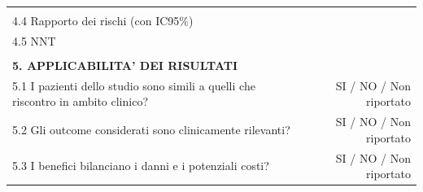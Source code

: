 \documentclass[]{book}
\begin{document}
\begin{longtable}[]{@{}lr@{}}
\begin{minipage}[t]{0.47\columnwidth}
\strut
\end{minipage}\tabularnewline
\begin{minipage}[t]{0.47\columnwidth}\raggedright
4.4 Rapporto dei rischi (con IC95\%)\strut
\end{minipage} & \begin{minipage}[t]{0.47\columnwidth}\raggedleft
\strut
\end{minipage}\tabularnewline
\begin{minipage}[t]{0.47\columnwidth}\raggedright
4.5 NNT\strut
\end{minipage} & \begin{minipage}[t]{0.47\columnwidth}\raggedleft
\strut
\end{minipage}\tabularnewline
\begin{minipage}[t]{0.47\columnwidth}\raggedright
\strut
\end{minipage} & \begin{minipage}[t]{0.47\columnwidth}\raggedleft
\strut
\end{minipage}\tabularnewline
\begin{minipage}[t]{0.47\columnwidth}\raggedright
\textbf{5. APPLICABILITA' DEI RISULTATI}\strut
\end{minipage} & \begin{minipage}[t]{0.47\columnwidth}\raggedleft
\strut
\end{minipage}\tabularnewline
\begin{minipage}[t]{0.47\columnwidth}\raggedright
5.1 I pazienti dello studio sono simili a quelli che riscontro in ambito clinico?\strut
\end{minipage} & \begin{minipage}[t]{0.47\columnwidth}\raggedleft
SI / NO / Non riportato\strut
\end{minipage}\tabularnewline
\begin{minipage}[t]{0.47\columnwidth}\raggedright
5.2 Gli outcome considerati sono clinicamente rilevanti?\strut
\end{minipage} & \begin{minipage}[t]{0.47\columnwidth}\raggedleft
SI / NO / Non riportato\strut
\end{minipage}\tabularnewline
\begin{minipage}[t]{0.47\columnwidth}\raggedright
5.3 I benefici bilanciano i danni e i potenziali costi?\strut
\end{minipage} & \begin{minipage}[t]{0.47\columnwidth}\raggedleft
SI / NO / Non riportato\strut
\end{minipage}\tabularnewline

\end{longtable}
\end{document}
